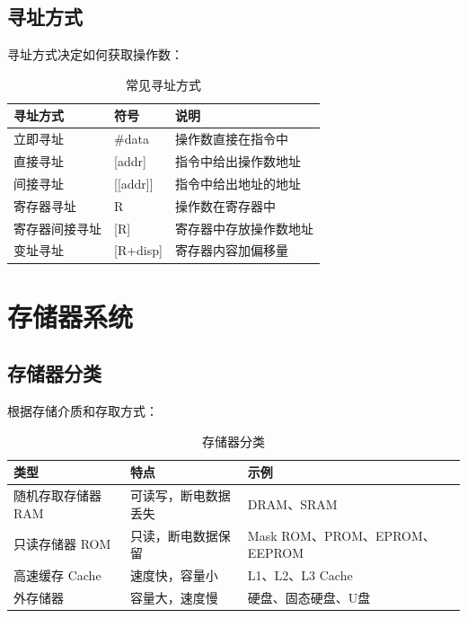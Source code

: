 \documentclass[12pt,UTF8]{ctexbook}
\begin{document}
\section{寻址方式}

寻址方式决定如何获取操作数：

\begin{table}[htbp]
    \centering
    \caption{常见寻址方式}
    \begin{tabular}{|p{3cm}|p{3cm}|p{4cm}|}
        \hline
        \textbf{寻址方式} & \textbf{符号} & \textbf{说明} \\
        \hline
        立即寻址 & \#data & 操作数直接在指令中 \\
        \hline
        直接寻址 & [addr] & 指令中给出操作数地址 \\
        \hline
        间接寻址 & [[addr]] & 指令中给出地址的地址 \\
        \hline
        寄存器寻址 & R & 操作数在寄存器中 \\
        \hline
        寄存器间接寻址 & [R] & 寄存器中存放操作数地址 \\
        \hline
        变址寻址 & [R+disp] & 寄存器内容加偏移量 \\
        \hline
    \end{tabular}
\end{table}

\chapter{存储器系统}
\label{chap:memory}

\section{存储器分类}

根据存储介质和存取方式：

\begin{table}[htbp]
    \centering
    \caption{存储器分类}
    \begin{tabular}{|p{3cm}|p{3cm}|p{4cm}|}
        \hline
        \textbf{类型} & \textbf{特点} & \textbf{示例} \\
        \hline
        随机存取存储器 RAM & 可读写，断电数据丢失 & DRAM、SRAM \\
        \hline
        只读存储器 ROM & 只读，断电数据保留 & Mask ROM、PROM、EPROM、EEPROM \\
        \hline
        高速缓存 Cache & 速度快，容量小 & L1、L2、L3 Cache \\
        \hline
        外存储器 & 容量大，速度慢 & 硬盘、固态硬盘、U盘 \\
        \hline
    \end{tabular}
\end{table}
\end{document}
